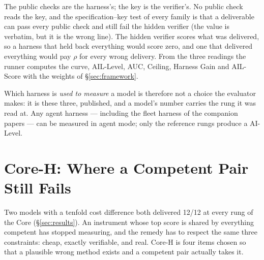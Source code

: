 The public checks are the harness's; the key is the verifier's. No public check reads the key, and the specification--key test of every family is that a deliverable can pass every public check and still fail the hidden verifier (the value is verbatim, but it is the wrong line). The hidden verifier scores what was delivered, so a harness that held back everything would score zero, and one that delivered everything would pay $\rho$ for every wrong delivery. From the three readings the runner computes the curve, AIL-Level, AUC, Ceiling, Harness Gain and AIL-Score with the weights of \S\ref{sec:framework}.

Which harness is \emph{used to measure} a model is therefore not a choice the evaluator makes: it is these three, published, and a model's number carries the rung it was read at. Any agent harness --- including the fleet harness of the companion papers --- can be measured in agent mode; only the reference rungs produce a AI-Level.

\section{Core-H: Where a Competent Pair Still Fails}\label{sec:coreh}

Two models with a tenfold cost difference both delivered 12/12 at every rung of the Core (\S\ref{sec:results}). An instrument whose top score is shared by everything competent has stopped measuring, and the remedy has to respect the same three constraints: cheap, exactly verifiable, and real. Core-H is four items chosen so that a plausible wrong method exists and a competent pair actually takes it.

